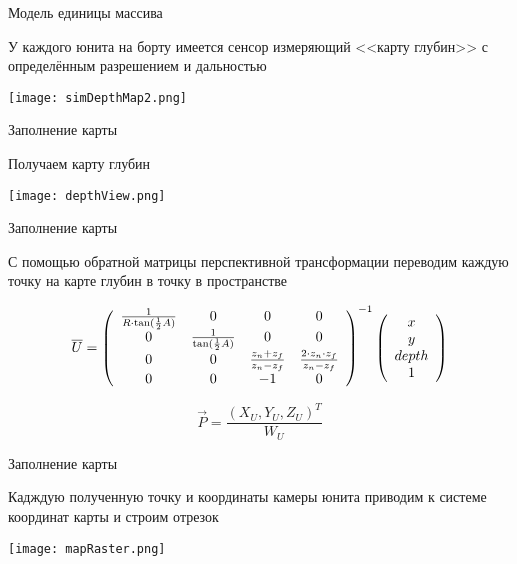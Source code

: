 \begin{tslide}{Модель единицы массива}

    У каждого юнита на борту имеется сенсор измеряющий \newline
    <<карту глубин>> с определённым разрешением и дальностью
    \vfill
    
    \texttt{[image: simDepthMap2.png]}
    \vfill

\end{tslide}

\begin{tslide}{Заполнение карты}

    Получаем карту глубин

    \vfill
    \begin{center}
    \texttt{[image: depthView.png]}
    \end{center}
    \vfill

\end{tslide}

\begin{tslide}{Заполнение карты}

    С помощью обратной матрицы перспективной трансформации
    переводим каждую точку на карте глубин в точку в пространстве

$$
\vec U = \left( \begin{array}{c c c c}
        \frac{1}{ R \cdot \tan( \frac{1}{2} A ) } & 0 & 0 & 0 \\
        0 & \frac{1}{ \tan( \frac{1}{2} A ) } & 0 & 0 \\
        0 & 0 & \frac{ z_{n} + z_{f} }{ z_{n}-z_{f} } & \frac{ 2 \cdot z_{n} \cdot z_{f} }{ z_{n} - z_{f} } \\
        0 & 0 & -1 & 0 \end{array} \right)^{-1}
    \left( \begin{array}{c} x \\ y \\ depth \\ 1 \end{array} \right)
$$

$$\vec P = \frac{( X_U, Y_U, Z_U )^T}{ W_U } $$

\end{tslide}

\begin{tslide}{Заполнение карты}

    Кадждую полученную точку и координаты камеры юнита
    приводим к системе координат карты и строим отрезок

    \vfill

    \begin{center}
    \texttt{[image: mapRaster.png]}
    \end{center}

    \vfill

\end{tslide}

